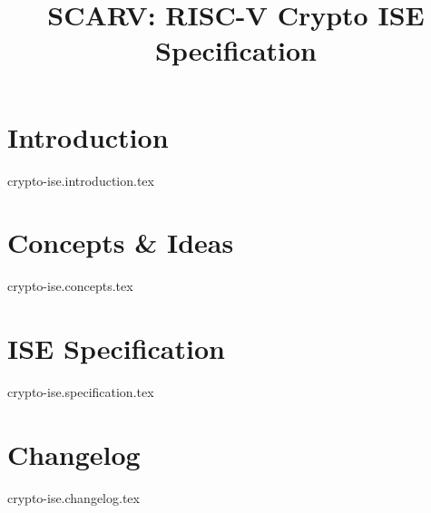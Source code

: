 \documentclass{article}
\title{SCARV: RISC-V Crypto ISE \\ Specification}
\begin{document}
\maketitle

\tableofcontents

\section{Introduction}
{crypto-ise.introduction.tex}

\section{Concepts \& Ideas}
{crypto-ise.concepts.tex}

\section{ISE Specification}
{crypto-ise.specification.tex}


\printbibliography


\section{Changelog}
{crypto-ise.changelog.tex}
\end{document}
